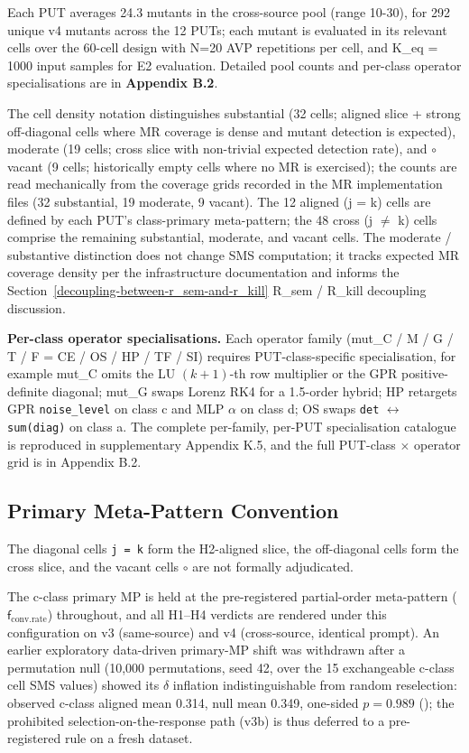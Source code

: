 \documentclass[manuscript,screen,review]{acmart}
\begin{document}
Each PUT averages 24.3 mutants in the cross-source pool (range
10-30), for 292 unique v4 mutants across the 12 PUTs; each mutant is
evaluated in its relevant cells over the 60-cell design with N=20 AVP
repetitions per cell, and K\_eq = 1000 input samples for E2 evaluation. Detailed
pool counts and per-class operator specialisations are in
\textbf{Appendix B.2}.

The cell density notation distinguishes \textbullet\textbullet substantial (32 cells;
aligned slice + strong off-diagonal cells where MR coverage is dense and
mutant detection is expected), \textbullet moderate (19 cells; cross slice with
non-trivial expected detection rate), and $\circ$ vacant (9 cells;
historically empty cells where no MR is exercised); the counts are
read mechanically from the coverage grids recorded in the MR
implementation files (32 substantial, 19 moderate, 9 vacant). The 12
aligned (j = k) cells are defined by each PUT's class-primary
meta-pattern; the 48 cross
(j $\neq$ k) cells comprise the remaining substantial, moderate, and
vacant cells. The \textbullet moderate / \textbullet\textbullet substantive
distinction does not change SMS computation; it tracks expected MR
coverage density per the infrastructure documentation and informs the Section~\ref{decoupling-between-r_sem-and-r_kill} R\_sem /
R\_kill decoupling discussion.

\textbf{Per-class operator specialisations.} Each operator family
(mut\_C / M / G / T / F = CE / OS / HP / TF / SI) requires PUT-class-specific
specialisation, for example mut\_C omits the LU $(k+1)$-th row multiplier or the
GPR positive-definite diagonal; mut\_G swaps Lorenz RK4 for a 1.5-order hybrid;
HP retargets GPR \texttt{noise\_level} on class c and MLP $\alpha$ on class d; OS
swaps \texttt{det} $\leftrightarrow$ \texttt{sum(diag)} on class a. The complete
per-family, per-PUT specialisation catalogue is reproduced in supplementary
Appendix K.5, and the full PUT-class $\times$ operator grid is in Appendix B.2.

\subsection{Primary Meta-Pattern Convention}\label{primary-mp-convention}

The diagonal cells \texttt{j\ =\ k} form the H2-aligned slice, the
off-diagonal cells form the cross slice, and the vacant cells \texttt{$\circ$}
are not formally adjudicated.

The c-class primary MP is held at the pre-registered partial-order meta-pattern
($\mathsf{f}_{\mathrm{conv.rate}}$) throughout, and all H1--H4 verdicts are rendered under this
configuration on v3 (same-source) and v4 (cross-source, identical prompt). An
earlier exploratory data-driven primary-MP shift was withdrawn after a
permutation null (10,000 permutations, seed 42, over the 15 exchangeable c-class
cell SMS values) showed its $\delta$ inflation indistinguishable from random
reselection: observed c-class aligned mean 0.314, null mean 0.349, one-sided
$p = 0.989$ (); the prohibited
selection-on-the-response path (v3b) is thus deferred to a pre-registered rule on
a fresh dataset.
\end{document}

